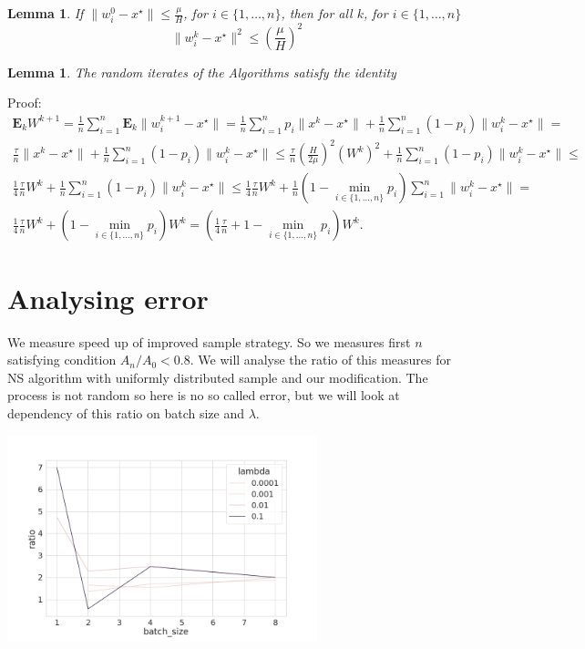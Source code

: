 \documentclass{article}
\newtheorem{lemma}[theorem]{Lemma}
\begin{document}
\begin{lemma}
If $\|w_i^0 - x^\star\| \leq \frac{\mu}{H}$, for $i \in \{1, \dots, n\}$, then for all $k$, for $i \in \{1, \dots, n\}$
\begin{equation}
    \|w_i^k - x^\star\|^2 \leq \left(\frac{\mu}{H}\right)^2
\end{equation}
\end{lemma}

\begin{lemma} The random iterates of the Algorithms satisfy the identity
\end{lemma}
Proof:
\begin{equation*}
\begin{split}
    \mathbf{E}_k W^{k + 1} = \frac{1}{n}\sum\limits_{i=1}^{n}\mathbf{E}_k\|w_i^{k + 1} - x^\star\| =
     \frac{1}{n}\sum\limits_{i=1}^{n}p_i\|x^k - x^\star\| + \frac{1}{n}\sum\limits_{i=1}^{n}(1 - p_i)\|w_i^k - x^\star\| = \\
     \frac{\tau}{n}\|x^k - x^\star\| + \frac{1}{n}\sum\limits_{i=1}^{n}(1 - p_i)\|w_i^k - x^\star\| \leq
     \frac{\tau}{n}\left(\frac{H}{2\mu}\right)^2\left(W^k\right)^2 + \frac{1}{n}\sum\limits_{i=1}^{n}(1 - p_i)\|w_i^k - x^\star\| \leq \\
     \frac{1}{4}\frac{\tau}{n}W^k + \frac{1}{n}\sum\limits_{i=1}^{n}(1 - p_i)\|w_i^k - x^\star\| \leq \frac{1}{4}\frac{\tau}{n}W^k + \frac{1}{n}(1 - \min_{i \in \{1, \dots, n\}}{p_i})\sum\limits_{i=1}^{n}\|w_i^k - x^\star\|  = \\ \frac{1}{4}\frac{\tau}{n}W^k + (1 - \min_{i \in \{1, \dots, n\}}{p_i})W^k =  \left(\frac{1}{4}\frac{\tau}{n} + 1 - \min_{i \in \{1, \dots, n\}}{p_i}\right)W^k.
\end{split}
\end{equation*}

\section{Analysing error}

We measure speed up of improved sample strategy. So we measures first $n$ satisfying condition $A_n/A_0 < 0.8$.
We will analyse the ratio of this measures for NS algorithm with uniformly distributed sample and our modification.
The process is not random so here is no so called error, but we will look at dependency of this ratio on batch size and $\lambda$.

\includegraphics[width=90mm]{lambda.png}
\end{document}

